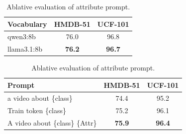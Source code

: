 \documentclass[runningheads]{llncs}
\begin{document}
\begin{table}[tb]
\centering
\scriptsize %
\setlength{\tabcolsep}{3pt} %

\begin{minipage}[t]{0.38\textwidth} 
    \vspace{0pt} %
    \centering
    \begin{threeparttable} 
        \caption{Ablative evaluation of attribute word generators.}
        \label{tab:attributewordgenerators}
        \begin{tabular}{@{}lcc@{}}
        \toprule
        Vocabulary & HMDB-51 & UCF-101 \\
        \midrule
        qwen3:8b & 76.0 & 96.8 \\
        llama3.1:8b & \textbf{76.2} & \textbf{96.7} \\
        \bottomrule
        \end{tabular}
    \end{threeparttable}
\end{minipage}\hfill
\begin{minipage}[t]{0.58\textwidth}
    \vspace{0pt} %
    \centering
    \begin{threeparttable}
        \caption{Ablative evaluation of attribute prompt.}
        \label{tab:attributeprompt}
        \begin{tabular}{@{}lcc@{}}
        \toprule
        Prompt & HMDB-51 & UCF-101 \\
        \midrule
        a video about \{class\} & 74.4 & 95.2 \\
        Train token \{class\}~\cite{zhou2022learning} & 75.2 & 96.1 \\
        A video about \{class\} \{Attr\} & \textbf{75.9} & \textbf{96.4} \\
        \bottomrule
        \end{tabular}
    \end{threeparttable}
\end{minipage}

\vspace{2mm} %


\end{table}
\end{document}
